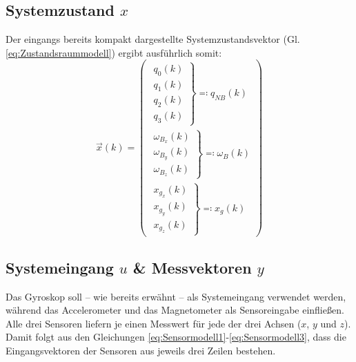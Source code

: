 \documentclass[12pt,a4paper]{article}
\begin{document}
		\subsection{Systemzustand $x$}\label{subsec:Systemzustand}
		Der eingangs bereits kompakt dargestellte Systemzustandsvektor (Gl. \ref{eq:Zustandsraummodell}) ergibt ausführlich somit: 
		\begin{equation}\label{eq:Systemzustand}
			\vec{x}(k)=\begin{pmatrix}
			\left. \begin{array}{c}q_{0}(k)\\q_{1}(k)\\q_{2}(k)\\q_{3}(k)\end{array}\right\}\eqqcolon q_{NB}(k)\\[2.0em]
			\left. \begin{array}{c}\omega_{B_{x}}(k)\\\omega_{B_{y}}(k)\\\omega_{B_{z}}(k)\end{array}\right\}\eqqcolon \omega_{B}(k)\\[1.5em]
			\left. \begin{array}{c}x_{g_{x}}(k)\\x_{g_{y}}(k)\\x_{g_{z}}(k)\end{array}\right\}\eqqcolon x_{g}(k)
			\end{pmatrix}
		\end{equation}
		\subsection{Systemeingang $u$ \& Messvektoren $y$}\label{subsec:Systemeingang&Messvektoren}
		Das Gyroskop soll -- wie bereits erwähnt -- als Systemeingang verwendet werden, während das Accelerometer und das Magnetometer als Sensoreingabe einfließen. Alle drei Sensoren liefern je einen Messwert für jede der drei Achsen ($x$, $y$ und $z$).\\
		Damit folgt aus den Gleichungen \ref{eq:Sensormodell1}-\ref{eq:Sensormodell3}, dass die Eingangsvektoren der Sensoren aus jeweils drei Zeilen bestehen.
\end{document}
